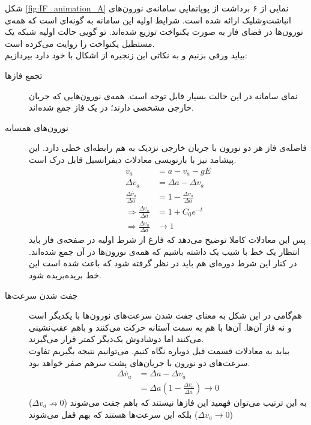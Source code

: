 شکل
\ref{fig:IF_animation_A}
نمایی از ۶ برداشت از پویانمایی سامانه‌ی نورون‌های انباشت‌وشلیک ارائه شده است. شرایط اولیه این سامانه به گونه‌ای است که همه‌ی نورون‌ها در فضای فاز به صورت یکنواخت توزیع شده‌اند. تو گویی حالت اولیه شبکه یک مستطیل یکنواخت را روایت می‌کرده است.\\
بیاید ورقی بزنیم و به نکاتی این زنجیره از اشکال با خود دارد بپردازیم:
\begin{description}
	\item[تجمع فازها] 
	نمای سامانه در این حالت بسیار قابل توجه است. همه‌ی نورون‌هایی که جریان خارجی مشخصی دارند؛ در یک فاز جمع شده‌اند.
	\item[نورون‌های همسایه] 
	 فاصله‌ی فاز هر دو نورون با جریان خارجی نزدیک به هم رابطه‌ای خطی دارد. این پیشامد نیز با بازنویسی معادلات دیفرانسیل قابل درک است.
	 \begin{align}
	 	\dot{v_a} &= a - v_a - g E\\
	 	\Delta\dot{v_a} &= \Delta a - \Delta v_a\\
	 	\frac{\Delta\dot{v_a}}{\Delta a} &= 1 - \frac{\Delta v_a}{\Delta a}\\
	 	\Rightarrow \frac{\Delta v_a}{\Delta a} &= 1 + C_0 e^{-t}\\
	 	\Rightarrow \frac{\Delta v_a}{\Delta a} &\rightarrow 1
	 \end{align}
 پس این معادلات کاملا توضیح می‌دهد که فارغ از شرط اولیه در صفحه‌ی فاز باید انتظار یک خط با شیب یک داشته باشیم که همه‌ی نورون‌ها در آن جمع شده‌اند. در کنار این شرط دوره‌ای هم باید در نظر گرفته شود که باعث شده است این خط بریده‌بریده شود.
 	\item[جفت شدن سرعت‌ها]
 	هم‌گامی در این شکل به معنای جفت شدن سرعت‌های نورون‌ها با یکدیگر است و نه فاز آن‌ها. آن‌ها با هم به سمت آستانه حرکت می‌کنند و باهم عقب‌نشینی می‌کنند اما دوشادوش یک‌دیگر کمتر قرار می‌گیرند.\\
 	بیاید به معادلات قسمت قبل دوباره نگاه کنیم. می‌توانیم نتیجه بگیریم تفاوت سرعت‌های دو نورون با جریان‌های پشت سرهم صفر خواهد بود.
 	\begin{align}
 		\Delta\dot{v_a} &= \Delta a - \Delta v_a\\
 		&= \Delta a (1 - \frac{\Delta v_a}{\Delta a}) \rightarrow 0
 	\end{align}
 	به این ترتیب می‌توان فهمید این فازها نیستند که باهم جفت می‌شوند 
 	($\Delta v_a \nrightarrow 0 $)
 	بلکه این سرعت‌ها هستند که بهم قفل می‌شوند
 	($\Delta \dot{v_a} \rightarrow 0 $)
\end{description}

